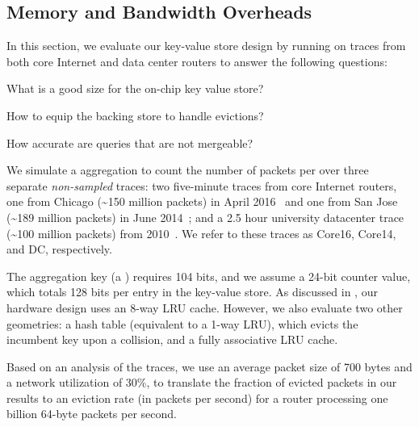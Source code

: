 \subsection{Memory and Bandwidth Overheads}
\label{s:eval:traces}
\label{sec:eval:traces}


In this section, we evaluate our key-value store design by running \TheSystem
on traces from both core Internet and data center routers to answer the
following questions:
\begin{CompactEnumerate}
\item What is a good size for the on-chip key value store?
\item How to equip the backing store to handle evictions?
\item How accurate are queries that are not mergeable?
\end{CompactEnumerate}

  We simulate a \TheSystem aggregation to count the number of
packets per \txtftuple over three separate {\em non-sampled} traces: two
five-minute traces from core Internet routers, one from Chicago
(\textasciitilde{}150 million packets) in April 2016~\cite{caida2016} and one
from San Jose (\textasciitilde{}189 million packets) in June
2014~\cite{caida2014}; and a 2.5 hour university datacenter trace
(\textasciitilde{}100 million packets) from 2010~\cite{bensonDC}. We refer to
these traces as Core16, Core14, and DC, respectively.

The aggregation key (a \txtftuple) requires 104 bits, and we assume a 24-bit
counter value, which totals 128 bits per entry in the key-value store. As
discussed in , our hardware design uses an 8-way LRU
cache. However, we also evaluate two other geometries: a hash table (equivalent to
a 1-way LRU), which
evicts the incumbent key upon a collision, and a fully associative LRU
cache.

Based on an analysis of the traces, we use an average packet size of 700 bytes
and a network utilization of 30\%, to translate the fraction of evicted packets in our
results to an eviction rate (in packets per second) for a router processing one
billion 64-byte packets per second.

